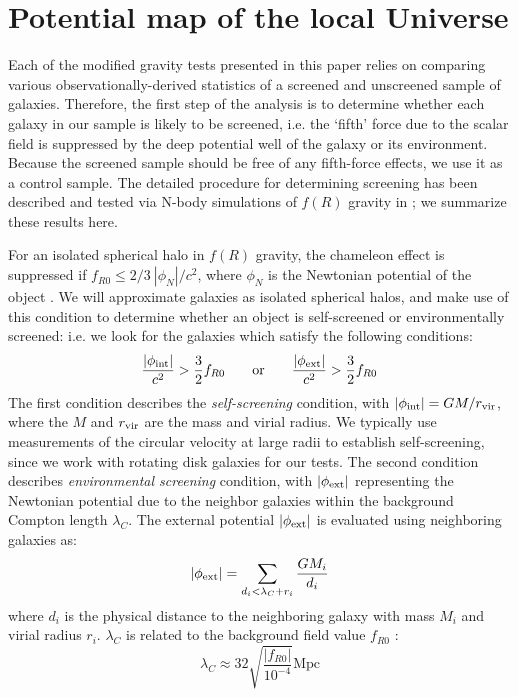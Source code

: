 \documentclass[twocolappendix, numberedappendix]{emulateapj}
\begin{document}
\section{Potential map of the local Universe}
\label{pot-sec}
Each of the modified gravity tests presented in this paper relies on comparing
various observationally-derived statistics of a screened and unscreened sample
of galaxies.
Therefore, the first step of the analysis is to determine whether each
galaxy in our sample is likely to be screened, i.e. the `fifth' force due
to the  scalar field is suppressed by the deep 
potential well of the galaxy or its environment.  
Because the screened sample should be free of any fifth-force effects, we use
it as a control sample.  The detailed procedure for 
determining screening has been described and tested via N-body simulations
of $f(R)$ gravity in \cite{cabre2012}; we summarize these results here.

For an isolated spherical halo in $f(R)$ gravity,
the chameleon effect is suppressed if $f_{R0} \leq 2/3\
|\phi_N|/c^2$, where $\phi_N$ is the Newtonian  potential of the object
\citep{hu07}. We will approximate galaxies as isolated spherical halos,
and make use of this condition to determine whether an
object is self-screened or environmentally screened: i.e. we look for the
galaxies which satisfy the following conditions: 
\begin{equation}
\label{eq:criterion} 
 \frac{|\phi_{\rm int}|}{c^2}>\frac{3}{2} f_{R0}\; \; \; \; \; \; \; \mathrm{or}
\; \; \; \; \; \; \; \frac{|\phi_{\rm ext}|}{c^2}>\frac{3}{2} f_{R0}
\end{equation}
The first condition describes the {\it self-screening} condition, with 
$ |\phi_{\rm int}|= GM/r_{\rm vir}$, where the $M$ and $r_{\rm vir}$ are the
mass and virial radius. We typically use measurements of the circular velocity at large radii to establish self-screening, since we work with rotating disk galaxies for our tests. 
The second condition describes {\it environmental
screening} condition, with $|\phi_{\rm ext}|$ representing the
Newtonian potential due to the neighbor galaxies within the background Compton
length $\lambda_C$.
The external potential $|\phi_{\rm ext}|$ is evaluated using 
neighboring galaxies as:
\begin{equation}\label{eq:criterion22} 
 |\phi_{\rm ext}|= \sum_{d_i<\lambda_C+r_i} \frac{GM_i}{d_i}
\end{equation}
where $d_i$ is the physical distance to the neighboring
galaxy with mass $M_i$ and virial radius $r_i$. $\lambda_C$ is related
to the background field value $f_{R0}$
\citep{sch09}:
\begin{equation}
 \lambda_C \approx 32 \sqrt{\frac{\left|f_{R0}\right|}{10^{-4}}} \mathrm{ Mpc}
 \label{eq:compton}
\end{equation}
\end{document}
